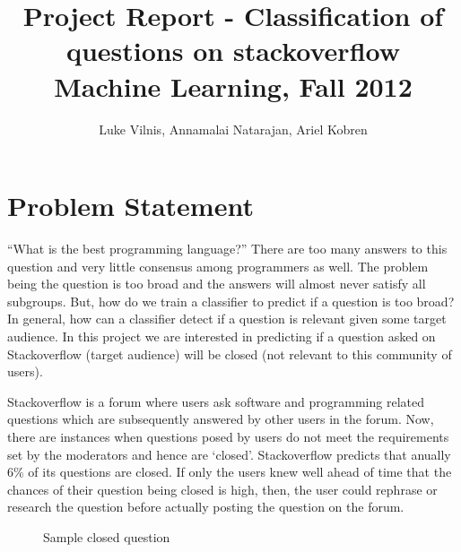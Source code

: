 \documentclass[11pt]{article}
\title{Project Report - Classification of questions on stackoverflow\\ Machine Learning, Fall 2012}
\author{Luke Vilnis, Annamalai Natarajan, Ariel Kobren}
\begin{document}
\sloppy

\maketitle

\section{Problem Statement}

``What is the best programming language?'' There are too many
answers to this question and very little consensus among programmers
as well. The problem being the question is too broad and the answers
will almost never satisfy all subgroups. But, how do we train a
classifier to predict if a question is too broad? In general, how can a
classifier detect if a question is relevant given some target
audience. In this project we are interested in predicting if a
question asked on Stackoverflow (target audience) will be closed (not
relevant to this community of users).

\noindent Stackoverflow \cite{website:stackoverflow} is a forum where
users ask software and programming related questions which are
subsequently answered by other users in the forum. Now, there are
instances when questions posed by users do not meet the requirements
set by the moderators and hence are `closed'. Stackoverflow predicts
that anually 6\% of its questions are closed. If only the users knew
well ahead of time that the chances of their question being closed is
high, then, the user could rephrase or research the question before
actually posting the question on the forum.

\begin{figure}
\centering
{}
\caption{Sample closed question}
\label{fig:sample}
\end{figure}
\end{document}
